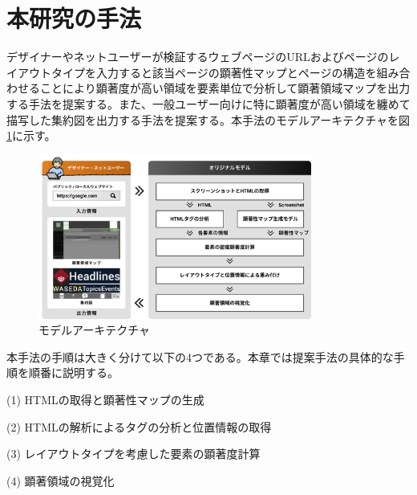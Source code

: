 \newpage
\renewcommand{\baselinestretch}{1.5}
\section{本研究の手法}
\renewcommand{\baselinestretch}{1}

\par デザイナーやネットユーザーが検証するウェブページのURLおよびページのレイアウトタイプを入力すると該当ページの顕著性マップとページの構造を組み合わせることにより顕著度が高い領域を要素単位で分析して顕著領域マップを出力する手法を提案する。また、一般ユーザー向けに特に顕著度が高い領域を纏めて描写した集約図を出力する手法を提案する。本手法のモデルアーキテクチャを図\ref{fig_ourmodel}に示す。

\begin{figure}[H]
    \centering
    \includegraphics[width=9cm]{figures/model.jpg}
    \caption{モデルアーキテクチャ}
    \label{fig_ourmodel}
\end{figure}

\par 本手法の手順は大きく分けて以下の4つである。本章では提案手法の具体的な手順を順番に説明する。
\par(1) HTMLの取得と顕著性マップの生成
\par(2) HTMLの解析によるタグの分析と位置情報の取得
\par(3) レイアウトタイプを考慮した要素の顕著度計算
\par(4) 顕著領域の視覚化\\

\newpage
